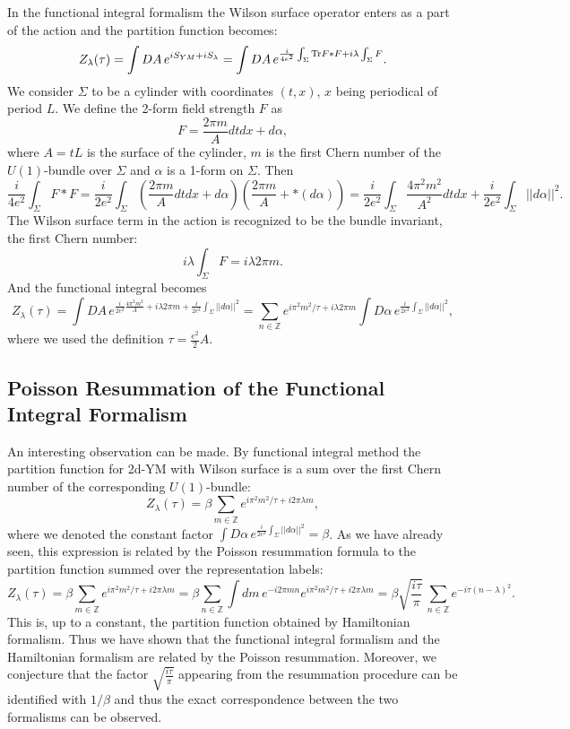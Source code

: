 \documentclass[11pt]{report}
\theoremstyle{plain}
\theoremstyle{definition}
\theoremstyle{remark}
\theoremstyle{remark}
\numberwithin{equation}{section}
\begin{document}
In the functional integral formalism the Wilson surface operator enters as a part of the action and the partition function becomes:
%
$$
Z_{\lambda}(\tau) = \int DA \, e^{iS_{YM} + iS_{\lambda}} = 
\int DA  \, e^{ \frac{i}{4e^2} \int_{\Sigma} {\rm Tr} F \ast F + i\lambda \int_{\Sigma} F }.
$$
We consider $\Sigma$ to be a cylinder with coordinates $(t, x)$, $x$ being periodical of period $L$. 
We define the 2-form field strength $F$ as
%
$$
F=\frac{2\pi m}{A}dtdx + d\alpha,
$$
where $A=tL$ is the surface of the cylinder, $m$ is the first Chern number of the $U(1)$-bundle over $\Sigma$ and $\alpha$ is a 1-form on $\Sigma$. 
Then 
%
$$
\frac{i}{4e^2}\int_{\Sigma} F\ast F = \frac{i}{2e^2}\int_{\Sigma} (\frac{2\pi m}{A}dtdx + d\alpha)(\frac{2\pi m}{A} + \ast (d\alpha)) = \frac{i}{2e^2}\int_{\Sigma} \frac{4\pi^2m^2}{A^2}dtdx + \frac{i}{2e^2}\int_{\Sigma} ||d\alpha ||^2.
$$
The Wilson surface term in the action is recognized to be the bundle invariant, the first Chern number:
%
$$
i\lambda \int_{\Sigma} F = i\lambda 2\pi m.
$$
And the functional integral becomes
%
$$
Z_{\lambda}(\tau) = \int DA \, e^{\frac{i}{2e^2} \frac{4\pi^2m^2}{A} +  i\lambda 2\pi m + \frac{i}{2e^2}\int_{\Sigma} ||d\alpha ||^2} = \sum_{n\in\mathbb{Z}} e^{i \pi^2m^2/\tau +  i\lambda 2\pi m} \int D\alpha \, e^{\frac{i}{2e^2}\int_{\Sigma} ||d\alpha ||^2},
$$
where we used the definition $\tau = \frac{e^2}{2}A$.


\subsection{Poisson Resummation of the Functional Integral Formalism}

An interesting observation can be made. By functional integral method the partition function for 2d-YM with Wilson surface is a sum over the first Chern number of the corresponding $U(1)$-bundle:
%
$$
Z_\lambda(\tau) = \beta \sum_{m \in \mathbb{Z}} e^{ i\pi^2m^2/\tau + i 2\pi \lambda m},
$$
where we denoted the constant factor $\int D\alpha \, e^{\frac{i}{2e^2}\int_{\Sigma} ||d\alpha ||^2}= \beta$.
As we have already seen, this expression is related by the Poisson resummation formula to the partition function summed over the representation labels:
%
$$
Z_\lambda(\tau) =  \beta\sum_{m \in \mathbb{Z}} e^{ i\pi^2m^2/\tau + i 2\pi \lambda m} =\beta \sum_{n \in \mathbb{Z}} \int dm \, e^{-i2\pi mn} e^{ i\pi^2m^2/\tau + i 2\pi \lambda m} = \beta \sqrt{\frac{i\tau}{\pi}} \,\sum_{n \in \mathbb{Z}} e^{-i\tau (n-\lambda)^2}.
$$
This is, up to a constant, the partition function obtained by Hamiltonian formalism. Thus we have shown that the functional integral formalism and the Hamiltonian formalism are related by the Poisson resummation. 
Moreover, we conjecture that the factor $\sqrt{\frac{i\tau}{\pi}}$ appearing from the resummation procedure can be identified with $1/ \beta$ and thus the exact correspondence between the two formalisms can be observed.
\end{document}
